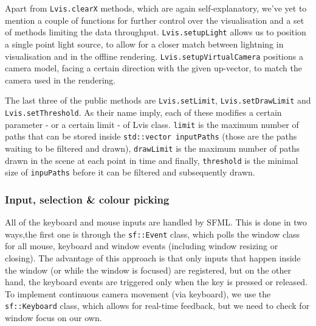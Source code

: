 Apart from \texttt{Lvis.clearX} methods, which are again self-explanatory, we've yet to mention a couple of functions for further control over the visualisation and a set of methods limiting the data throughput. \texttt{Lvis.setupLight} allows us to position a single point light source, to allow for a closer match between lightning in visualisation and in the offline rendering. \texttt{Lvis.setupVirtualCamera} positions a camera model, facing a certain direction with the given up-vector, to match the camera used in the rendering. 

The last three of the public methods are \texttt{Lvis.setLimit}, \texttt{Lvis.setDrawLimit} and \texttt{Lvis.setThreshold}. As their name imply, each of these modifies a certain parameter - or a certain limit - of Lvis class. \texttt{limit} is the maximum number of paths that can be stored inside \texttt{std::vector inputPaths} (those are the paths waiting to be filtered and drawn), \texttt{drawLimit} is the maximum number of paths drawn in the scene at each point in time and finally, \texttt{threshold} is the minimal size of \texttt{inpuPaths} before it can be filtered and subsequently drawn.

\subsubsection{Input, selection \& colour picking}

All of the keyboard and mouse inputs are handled by SFML. This is done in two ways,the first one is through the \texttt{sf::Event} class, which polls the window class for all mouse, keyboard and window events (including window resizing or closing). The advantage of this approach is that only inputs that happen inside the window (or while the window is focused) are registered, but on the other hand, the keyboard events are triggered only when the key is pressed or released. To implement continuous camera movement (via keyboard), we use the \texttt{sf::Keyboard} class, which allows for real-time feedback, but we need to check for window focus on our own.


